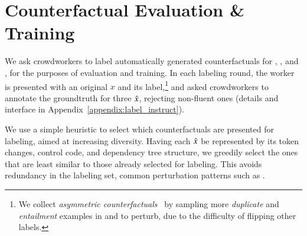 \section{Counterfactual Evaluation \& Training}
\label{sec:app_label}

We ask crowdworkers to label automatically generated counterfactuals for \sst, \nli, and \qqp, for the purposes of evaluation and training. In each labeling round, the worker is presented with an original $x$ and its label,\footnote{We collect \emph{asymmetric counterfactuals}~\cite{garg2019counterfactual} by sampling more \emph{duplicate} and \emph{entailment} examples in \qqp and \nli to perturb, due to the difficulty of flipping other labels.} and asked crowdworkers to annotate the groundtruth for three $\hat{x}$, rejecting non-fluent ones (details and interface in Appendix~\ref{appendix:label_instruct}).

We use a simple heuristic to select which counterfactuals are presented for labeling, aimed at increasing diversity. 
Having each $\hat{x}$ be represented by its token changes, control code, and dependency tree structure, we greedily select the ones that are least similar to those already selected for labeling. 
This avoids redundancy in the labeling set, \eg common perturbation patterns such as .



